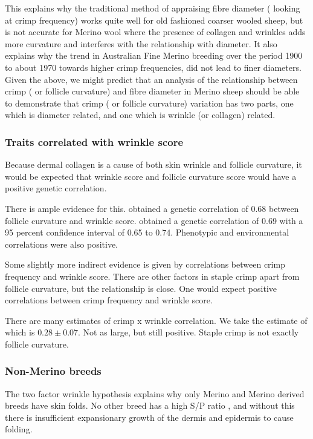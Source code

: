 \documentclass{article}
\begin{document}
This explains why the traditional method of appraising fibre diameter ( looking at crimp frequency) works quite well for old fashioned coarser wooled sheep, but is not accurate for Merino wool where the presence of collagen and wrinkles adds more curvature and interferes with the relationship with diameter. It also explains why the trend in Australian Fine Merino breeding over the period 1900 to about 1970 towards higher crimp frequencies, did not lead to finer diameters. 
Given the above, we might predict that an analysis of the relationship between crimp ( or follicle curvature) and fibre diameter in Merino sheep should be able to demonstrate that crimp ( or follicle curvature) variation has two parts, one which is diameter related, and one which is wrinkle (or collagen) related.


\subsubsection{Traits correlated with wrinkle score}
Because dermal collagen is a cause of both skin wrinkle and follicle curvature, it would be expected that wrinkle score and follicle curvature score would have a positive genetic correlation. 

There is ample evidence for this. \cite{jackson-1975} obtained a genetic correlation of 0.68 between follicle curvature and wrinkle score.  \cite{jackson-2017a} obtained a genetic correlation of 0.69 with a 95 percent confidence interval of 0.65 to 0.74. Phenotypic and environmental correlations were also positive.

Some slightly more indirect evidence is given by correlations between crimp frequency and wrinkle score. There are other factors in staple crimp apart from follicle curvature, but the relationship is close. One would expect positive correlations between crimp frequency and wrinkle score. 

There are many estimates  of crimp x wrinkle correlation. We take the estimate of \cite{brown-1968} which is $0.28 \pm 0.07$. Not as large, but still positive. Staple crimp is not exactly follicle curvature. 

\subsubsection{Non-Merino breeds}
The two factor wrinkle hypothesis explains why only Merino and Merino derived breeds have skin folds. No other breed has a high S/P ratio , and without this there is insufficient expansionary growth of the dermis and epidermis to cause folding. 
\end{document}
